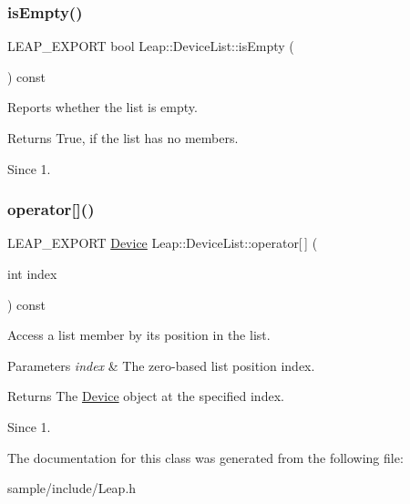 \subsubsection{\texorpdfstring{is\+Empty()}{isEmpty()}}
{\footnotesize\ttfamily L\+E\+A\+P\+\_\+\+E\+X\+P\+O\+RT bool Leap\+::\+Device\+List\+::is\+Empty (\begin{DoxyParamCaption}{ }\end{DoxyParamCaption}) const}

Reports whether the list is empty.


\begin{DoxyCodeInclude}
\end{DoxyCodeInclude}


\begin{DoxyReturn}{Returns}
True, if the list has no members. 
\end{DoxyReturn}
\begin{DoxySince}{Since}
1. 
\end{DoxySince}
\mbox{\label{class_leap_1_1_device_list_a82c41ea0a7175aca06d00bfb2505ee4f}} 
\subsubsection{\texorpdfstring{operator[]()}{operator[]()}}
{\footnotesize\ttfamily L\+E\+A\+P\+\_\+\+E\+X\+P\+O\+RT \hyperlink{class_leap_1_1_device}{Device} Leap\+::\+Device\+List\+::operator\mbox{[}$\,$\mbox{]} (\begin{DoxyParamCaption}\item[{int}]{index }\end{DoxyParamCaption}) const}

Access a list member by its position in the list. 
\begin{DoxyParams}{Parameters}
{\em index} & The zero-\/based list position index. \\
\hline
\end{DoxyParams}
\begin{DoxyReturn}{Returns}
The \hyperlink{class_leap_1_1_device}{Device} object at the specified index. 
\end{DoxyReturn}
\begin{DoxySince}{Since}
1. 
\end{DoxySince}


The documentation for this class was generated from the following file\+:\begin{DoxyCompactItemize}
\item 
sample/include/Leap.\+h\end{DoxyCompactItemize}
